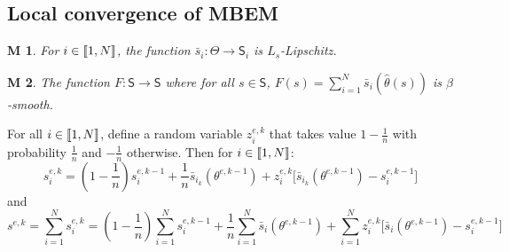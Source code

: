 \documentclass[11pt]{article}
\theoremstyle{plain}
\newtheorem{assumption}{M}
\begin{document}
\subsection{Local convergence of MBEM}
\begin{assumption}
For $i \in \llbracket1,N\rrbracket$,  the function $\bar{s}_i: \Theta \to \mathsf{S}_i$ is $L_s$-Lipschitz.
\end{assumption}

\begin{assumption}
The function $F: \mathsf{S} \to \mathsf{S}$ where for all $s \in  \mathsf{S}$, $F(s) = \sum_{i=1}^N \bar{s}_i (\hat{\theta}(s))$ is $\beta$-smooth.
\end{assumption}
For all $i \in \llbracket1,N\rrbracket$, define a random variable $z_i^{e,k}$ that takes value $1-\frac{1}{n}$ with probability $\frac{1}{n}$ and $-\frac{1}{n}$ otherwise. Then for $i \in \llbracket1,N\rrbracket$:
\begin{equation}
s_i^{e,k} = (1-\frac{1}{n}) s_i^{e,k-1} + \frac{1}{n}\bar{s}_{i_k}(\theta^{e,k-1}) + z_i^{e,k} \Big[\bar{s}_{i_k}(\theta^{e,k-1}) - s_i^{e,k-1}\Big]
\end{equation}
and
\begin{equation}
s^{e,k} =  \sum_{i=1}^N s_i^{e,k} = (1-\frac{1}{n})  \sum_{i=1}^N s_i^{e,k-1} + \frac{1}{n}  \sum_{i=1}^N \bar{s}_i(\theta^{e,k-1}) +  \sum_{i=1}^N z_i^{e,k} \Big[\bar{s}_i(\theta^{e,k-1}) - s_i^{e,k-1}\Big]
\end{equation}
\end{document}
